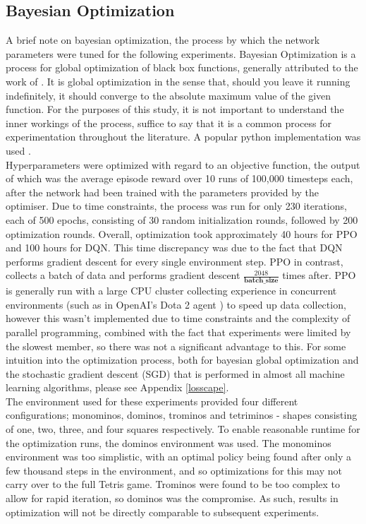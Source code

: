 \documentclass[12pt]{article}
\begin{document}
\subsection{Bayesian Optimization}
A brief note on bayesian optimization, the process by which the network parameters were tuned for the following experiments. Bayesian Optimization is a process for global optimization of black box functions, generally attributed to the work of \textcite{MockusJonas1989Batg}. It is global optimization in the sense that, should you leave it running indefinitely, it should converge to the absolute maximum value of the given function. For the purposes of this study, it is not important to understand the inner workings of the process, suffice to say that it is a common process for experimentation throughout the literature. A popular python implementation was used \autocite{bayesoptgithub}.\\\newline
Hyperparameters were optimized with regard to an objective function, the output of which was the average episode reward over 10 runs of 100,000 timesteps each, after the network had been trained with the parameters provided by the optimiser. Due to time constraints, the process was run for only 230 iterations, each of 500 epochs, consisting of 30 random initialization rounds, followed by 200 optimization rounds. Overall, optimization took approximately 40 hours for PPO and 100 hours for DQN. This time discrepancy was due to the fact that DQN performs gradient descent for every single environment step. PPO in contrast, collects a batch of data and performs gradient descent $\frac{2048}{\textbf{batch\_size}}$ times after. PPO is generally run with a large CPU cluster collecting experience in concurrent environments (such as in OpenAI's Dota 2 agent \autocite{DBLP:journals/corr/abs-1912-06680}) to speed up data collection, however this wasn't implemented due to time constraints and the complexity of parallel programming, combined with the fact that experiments were limited by the slowest member, so there was not a significant advantage to this. For some intuition into the optimization process, both for bayesian global optimization and the stochastic gradient descent (SGD) that is performed in almost all machine learning algorithms, please see Appendix \ref{losscape}.
\\\newline The environment used for these experiments provided four different configurations; monominos, dominos, trominos and tetriminos - shapes consisting of one, two, three, and four squares respectively. To enable reasonable runtime for the optimization runs, the dominos environment was used. The monominos environment was too simplistic, with an optimal policy being found after only a few thousand steps in the environment, and so optimizations for this may not carry over to the full Tetris game. Trominos were found to be too complex to allow for rapid iteration, so dominos was the compromise. As such, results in optimization will not be directly comparable to subsequent experiments.
\end{document}
